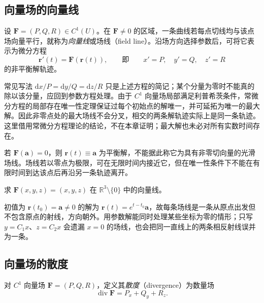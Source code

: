 \subsection{向量场的向量线}
\label{subsec:field-lines-of-vector-fields}

\begin{definition}
\label{def:vector-field-lines}
设 $\boldsymbol F=(P,Q,R)\in C^1(U)$。在 $\boldsymbol F\neq0$ 的区域，一条曲线若每点切线均与该点场向量平行，就称为\emph{向量线}或场线（field line）。沿场方向选择参数后，可将它表示为微分方程
\begin{equation}
\label{eq:field-line-ode}
    \boldsymbol r'(t)=\boldsymbol F(\boldsymbol r(t)),
    \qquad\text{即}\qquad x'=P,\quad y'=Q,\quad z'=R
\end{equation}
的非平衡解轨迹。
\end{definition}

常见写法 $\mathrm dx/P=\mathrm dy/Q=\mathrm dz/R$ 只是上述方程的简记；某个分量为零时不能真的除以该分量，应回到参数方程处理。由于 $C^1$ 向量场局部满足利普希茨条件，常微分方程的局部存在唯一性定理保证过每个初始点的解唯一，并可延拓为唯一的最大解。因此非零点处的最大场线不会分叉，相交的两条解轨迹实际上是同一条轨迹。这里借用常微分方程理论的结论，不在本章证明；最大解也未必对所有实数时间存在。

若 $\boldsymbol F(\boldsymbol a)=0$，则 $\boldsymbol r(t)\equiv\boldsymbol a$ 为平衡解，不能据此称它为具有非零切向量的光滑场线。场线若以零点为极限，可在无限时间内接近它，但在唯一性条件下不能在有限时间到达该点后再沿另一条轨迹离开。

\begin{example}
\label{ex:radial-vector-field-lines}
求 $\boldsymbol F(x,y,z)=(x,y,z)$ 在 $\mathbb R^3\setminus\{0\}$ 中的向量线。
\end{example}
\begin{solve}
初值为 $\boldsymbol r(t_0)=\boldsymbol a\neq0$ 的解为 $\boldsymbol r(t)=e^{t-t_0}\boldsymbol a$，故每条场线是一条从原点出发但不包含原点的射线，方向朝外。用参数解能同时处理某些坐标为零的情形；只写 $y=C_1x$、$z=C_2x$ 会遗漏 $x=0$ 的场线，也会把同一直线上的两条相反射线误并为一条。
\end{solve}

\subsection{向量场的散度}
\label{subsec:divergence-of-vector-fields}

\begin{definition}
\label{def:vector-field-divergence}
对 $C^1$ 向量场 $\boldsymbol F=(P,Q,R)$，定义其\emph{散度}（divergence）为数量场
\[
    \operatorname{div}\boldsymbol F=P_x+Q_y+R_z.
\]
\end{definition}


